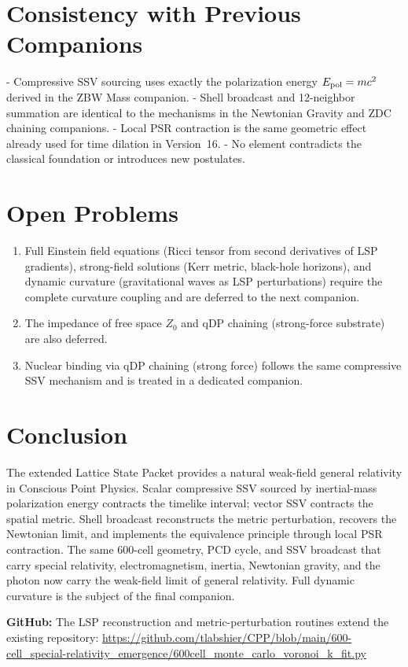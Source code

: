 \documentclass[12pt]{article}
\begin{document}
\section{Consistency with Previous Companions}
- Compressive SSV sourcing uses exactly the polarization energy \(E_{\rm pol} = mc^2\) derived in the ZBW Mass companion.
- Shell broadcast and 12-neighbor summation are identical to the mechanisms in the Newtonian Gravity and ZDC chaining companions.
- Local PSR contraction is the same geometric effect already used for time dilation in Version~16.
- No element contradicts the classical foundation or introduces new postulates.

\section{Open Problems}
\begin{enumerate}
\item Full Einstein field equations (Ricci tensor from second derivatives of LSP gradients), strong-field solutions (Kerr metric, black-hole horizons), and dynamic curvature (gravitational waves as LSP perturbations) require the complete curvature coupling and are deferred to the next companion.
\item The impedance of free space \(Z_0\) and qDP chaining (strong-force substrate) are also deferred.
\item Nuclear binding via qDP chaining (strong force) follows the same compressive SSV mechanism and is treated in a dedicated companion.
\end{enumerate}

\section{Conclusion}
The extended Lattice State Packet provides a natural weak-field general relativity in Conscious Point Physics. Scalar compressive SSV sourced by inertial-mass polarization energy contracts the timelike interval; vector SSV contracts the spatial metric. Shell broadcast reconstructs the metric perturbation, recovers the Newtonian limit, and implements the equivalence principle through local PSR contraction. The same 600-cell geometry, PCD cycle, and SSV broadcast that carry special relativity, electromagnetism, inertia, Newtonian gravity, and the photon now carry the weak-field limit of general relativity. Full dynamic curvature is the subject of the final companion.

\textbf{GitHub:} The LSP reconstruction and metric-perturbation routines extend the existing repository:  
\url{https://github.com/tlabshier/CPP/blob/main/600-cell_special-relativity_emergence/600cell_monte_carlo_voronoi_k_fit.py}
\end{document}
